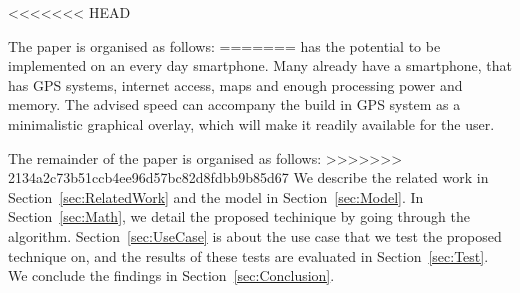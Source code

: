 <<<<<<< HEAD

The paper is organised as follows: 
=======
\tech has the potential to be implemented on an every day smartphone. 
Many already have a smartphone, that has GPS systems, internet access, maps and enough processing power and memory.
The advised speed can accompany the build in GPS system as a minimalistic graphical overlay, which will make it readily available for the user.

The remainder of the paper is organised as follows: 
>>>>>>> 2134a2c73b51ccb4ee96d57bc82d8fdbb9b85d67
We describe the related work in Section~\ref{sec:RelatedWork} and the model in Section~\ref{sec:Model}. 
In Section~\ref{sec:Math}, we detail the proposed techinique by going through the algorithm.
Section~\ref{sec:UseCase} is about the use case that we test the proposed technique on, and the results of these tests are evaluated in Section~\ref{sec:Test}. 
We conclude the findings in Section~\ref{sec:Conclusion}.





